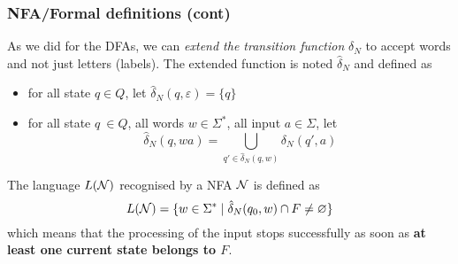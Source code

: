 % 
\begin{frame}
\frametitle{NFA/Formal definitions (cont)}

As we did for the DFAs, we can \emph{extend the transition function}
\(\delta_N\) to accept words and not just letters (labels). The extended
function is noted \(\hat{\delta}_N\) and defined as
\begin{itemize}

  \item for all state \(q \in Q\), let \(\hat{\delta}_N (q,
  \varepsilon) = \{q\}\)

  \item for all state \(q\ \in Q\), all words \(w \in \Sigma^{*}\),
  all input \(a \in \Sigma\), let \[\hat{\delta}_N (q, wa) =
  \bigcup_{q' \in \hat{\delta}_N (q, w)}{\delta_N  (q', a)}\]
\end{itemize}
The language \(L({\cal N})\) recognised by a NFA \(\cal N\) is
defined as
\[
L({\cal N}) = \{w \in \Sigma^{*} \; \lvert \; \hat{\delta}_N (q_0, w)
\cap F \neq \varnothing\}
\]
which means that the processing of the input stops successfully as
soon as \textbf{at least one current state belongs to \(F\)}.

\end{frame}

